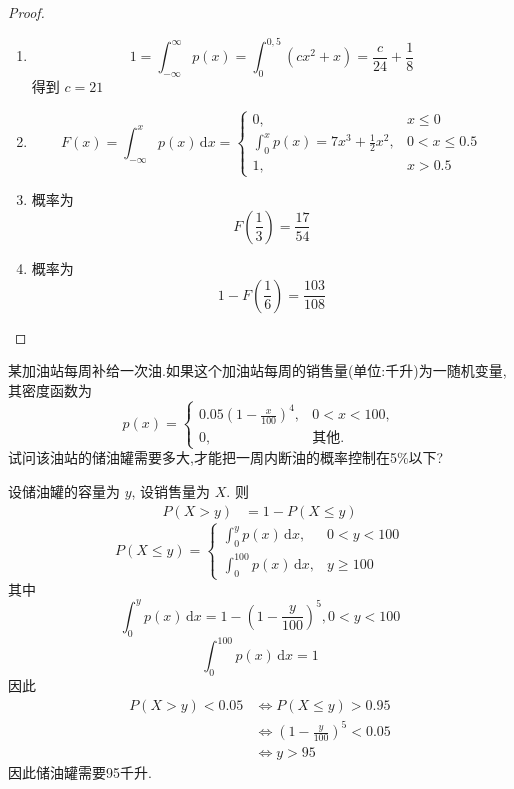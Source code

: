 \documentclass[../main.tex]{subfiles}
\begin{document}
\begin{proof}
     \begin{enumerate}
        \item \[
     1= \int_{-\infty}^{\infty}p\left( x \right)= \int_{0}^{0,5}\left( cx^{2}+ x \right)= \frac{c }{24 }+ \frac{1 }{8 }  
     \]得到 \(  c= 21  \) 
     \item  \[
     F\left( x \right)= \int_{-\infty}^{x}p\left( x \right)\,\mathrm{d} x= \begin{cases} 0,&x\le 0\\ 
      \int_{0}^{x}p\left( x \right)= 7x^{3}+ \frac{1 }{2 }x^{2} ,& 0< x\le 0.5\\ 
       1,& x> 0.5  \end{cases}   
     \]
     \item 概率为 \[
     F\left( \frac{1 }{3 }  \right)= \frac{17 }{54 }  
     \]
     \item 概率为 \[
     1-F\left( \frac{1 }{6 }  \right)=  \frac{103 }{108 } 
     \]
     \end{enumerate}
     
\end{proof}
\begin{exercise}{}{}
某加油站每周补给一次油.如果这个加油站每周的销售量(单位:千升)为一随机变量,其密度函数为
\[ p(x) = \begin{cases} 0.05\left(1-\frac{x}{100}\right)^4, & 0<x<100, \\ 0, & \text{其他}. \end{cases} \]
试问该油站的储油罐需要多大,才能把一周内断油的概率控制在5\%以下?
\end{exercise}
\begin{solution}
    设储油罐的容量为 \(  y  \), 设销售量为 \(  X  \). 则 \[
  \begin{aligned}
    P\left( X> y \right)&=  1-P\left( X\le y \right) 
  \end{aligned} 
    \]   \[
    P\left( X\le y \right)= \begin{cases} \int_{0}^{y}p \left( x \right)\,\mathrm{d} x,& 0< y< 100  \\ 
      \int_{0}^{100}p\left( x \right)\,\mathrm{d} x,&y\ge 100 \end{cases}  
    \] 其中\[
    \int_{0}^{y}p\left( x \right)\,\mathrm{d} x = 1-\left( 1-\frac{y }{100 }  \right)^{5}, 0< y< 100
    \] \[
    \int_{0}^{100}p\left( x \right)\,\mathrm{d} x=1 
    \]因此 \[
    \begin{aligned}
    P\left( X> y \right)< 0.05&\iff P\left( X\le y \right)> 0.95 \\ 
     &\iff \left( 1-\frac{y }{100 }  \right)^{5}< 0.05\\ 
      &\iff y> 95 
    \end{aligned}
    \]因此储油罐需要95千升.
\end{solution}
\end{document}
